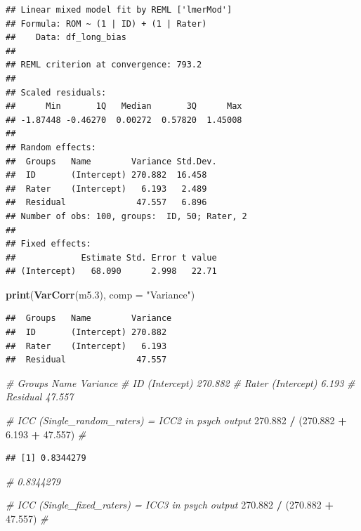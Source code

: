 \documentclass[
]{book}
\newenvironment{Shaded}{\begin{snugshade}}{\end{snugshade}}
\newcommand{\AttributeTok}[1]{\textcolor[rgb]{0.13,0.29,0.53}{#1}}
\newcommand{\CommentTok}[1]{\textcolor[rgb]{0.56,0.35,0.01}{\textit{#1}}}
\newcommand{\FloatTok}[1]{\textcolor[rgb]{0.00,0.00,0.81}{#1}}
\newcommand{\FunctionTok}[1]{\textcolor[rgb]{0.13,0.29,0.53}{\textbf{#1}}}
\newcommand{\NormalTok}[1]{#1}
\newcommand{\SpecialCharTok}[1]{\textcolor[rgb]{0.81,0.36,0.00}{\textbf{#1}}}
\newcommand{\StringTok}[1]{\textcolor[rgb]{0.31,0.60,0.02}{#1}}
\begin{document}
\begin{verbatim}
## Linear mixed model fit by REML ['lmerMod']
## Formula: ROM ~ (1 | ID) + (1 | Rater)
##    Data: df_long_bias
## 
## REML criterion at convergence: 793.2
## 
## Scaled residuals: 
##      Min       1Q   Median       3Q      Max 
## -1.87448 -0.46270  0.00272  0.57820  1.45008 
## 
## Random effects:
##  Groups   Name        Variance Std.Dev.
##  ID       (Intercept) 270.882  16.458  
##  Rater    (Intercept)   6.193   2.489  
##  Residual              47.557   6.896  
## Number of obs: 100, groups:  ID, 50; Rater, 2
## 
## Fixed effects:
##             Estimate Std. Error t value
## (Intercept)   68.090      2.998   22.71
\end{verbatim}

\begin{Shaded}
\begin{Highlighting}[]
\FunctionTok{print}\NormalTok{(}\FunctionTok{VarCorr}\NormalTok{(m5}\FloatTok{.3}\NormalTok{), }\AttributeTok{comp =} \StringTok{"Variance"}\NormalTok{)}
\end{Highlighting}
\end{Shaded}

\begin{verbatim}
##  Groups   Name        Variance
##  ID       (Intercept) 270.882 
##  Rater    (Intercept)   6.193 
##  Residual              47.557
\end{verbatim}

\begin{Shaded}
\begin{Highlighting}[]
\CommentTok{\# Groups   Name        Variance}
\CommentTok{\# ID       (Intercept) 270.882 }
\CommentTok{\# Rater    (Intercept)   6.193 }
\CommentTok{\# Residual              47.557 }


\CommentTok{\# ICC (Single\_random\_raters) = ICC2 in psych output}
\FloatTok{270.882} \SpecialCharTok{/}\NormalTok{ (}\FloatTok{270.882} \SpecialCharTok{+} \FloatTok{6.193} \SpecialCharTok{+} \FloatTok{47.557}\NormalTok{) }\CommentTok{\# }
\end{Highlighting}
\end{Shaded}

\begin{verbatim}
## [1] 0.8344279
\end{verbatim}

\begin{Shaded}
\begin{Highlighting}[]
\CommentTok{\# 0.8344279}

\CommentTok{\# ICC (Single\_fixed\_raters) = ICC3 in psych output}
\FloatTok{270.882} \SpecialCharTok{/}\NormalTok{ (}\FloatTok{270.882} \SpecialCharTok{+} \FloatTok{47.557}\NormalTok{) }\CommentTok{\#}
\end{Highlighting}
\end{Shaded}
\end{document}
